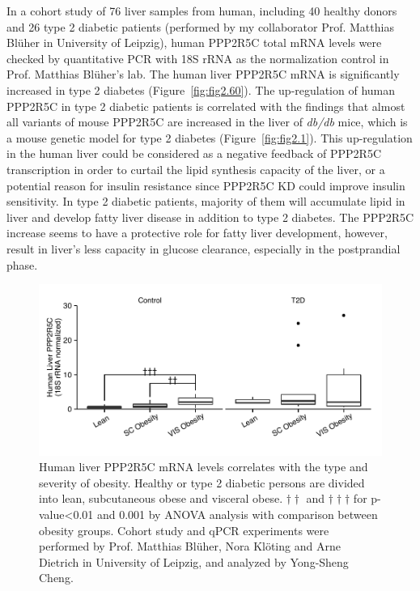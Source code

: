 In a cohort study of 76 liver samples from human, including 40 healthy donors and 26 type 2 diabetic patients (performed by my collaborator Prof. Matthias Bl\"uher in University of Leipzig), human PPP2R5C total mRNA levels were checked by quantitative PCR with 18S rRNA as the normalization control in Prof. Matthias Bl\"uher's lab. The human liver PPP2R5C mRNA is significantly increased in type 2 diabetes (Figure~\ref{fig:fig2.60}). The up-regulation of human PPP2R5C in type 2 diabetic patients is correlated with the findings that almost all variants of mouse PPP2R5C are increased in the liver of \textit{db/db} mice, which is a mouse genetic model for type 2 diabetes (Figure~\ref{fig:fig2.1}). This up-regulation in the human liver could be considered as  a negative feedback of PPP2R5C transcription in order to curtail the lipid synthesis capacity of the liver, or a potential reason for insulin resistance since PPP2R5C KD could improve insulin sensitivity. In type 2 diabetic patients, majority of them will accumulate lipid in liver and develop fatty liver disease in addition to type 2 diabetes. The PPP2R5C increase seems to have a protective role for fatty liver development, however, result in liver's less capacity in glucose clearance, especially in the postprandial phase.

\begin{figure}[htbp]
\centering
\includegraphics[width=1\textwidth]{figs/fig2-61 human ppp2r5c vs ob group.pdf}
\caption[Human PPP2R5C levels correlates with obesity type]{\footnotesize Human liver PPP2R5C mRNA levels correlates with the type and severity of obesity. Healthy or type 2 diabetic persons are divided into lean, subcutaneous obese and visceral obese. $\dagger\dagger$ and $\dagger\dagger\dagger$ for p-value<0.01 and 0.001 by \gls{ANOVA} analysis with comparison between obesity groups. Cohort study and qPCR experiments were performed by Prof. Matthias Bl\"uher, Nora Kl\"oting and Arne Dietrich in University of Leipzig, and analyzed by Yong-Sheng Cheng.}
\label{fig:fig2.61}
\end{figure}

